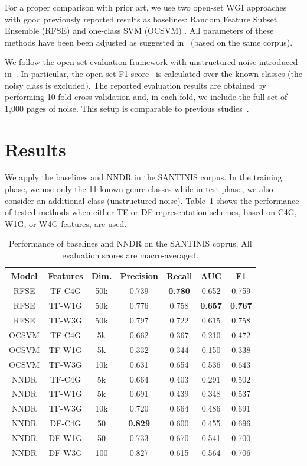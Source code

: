 \documentclass{llncs}
\begin{document}
For a proper comparison with prior art, we use two open-set WGI approaches with good previously reported results as baselines: Random Feature Subset Ensemble (RFSE) and one-class SVM (OCSVM) \cite{pritsos2013open,pritsos2018open}. All parameters of these methods have been been adjusted as suggested in~\cite{pritsos2018open} (based on the same corpus).

We follow the open-set evaluation framework with unstructured noise introduced in~\cite{pritsos2018open}. In particular, the open-set F1 score~\cite{mendesjunior2016} is calculated over the known classes (the noisy class is excluded). The reported evaluation results are obtained by performing 10-fold cross-validation and, in each fold, we include the full set of 1,000 pages of noise. This setup is comparable to previous studies~\cite{pritsos2018open}.

\section{Results}\label{sec:Experiments_Results}

We apply the baselines and NNDR in the SANTINIS corpus. In the training phase, we use only the 11 known genre classes while in test phase, we also consider an additional class (unstructured noise). Table~\ref{tbl:results} shows the performance of tested methods when either TF or DF representation schemes, based on C4G, W1G, or W4G features, are used. 

\begin{table}[t]
\center
\caption {Performance of baselines and NNDR on the SANTINIS coprus. All evaluation scores are macro-averaged.}
\label{tbl:results}
\begin{tabular}{ccccccc}
\hline
Model & Features & Dim. & Precision & Recall & AUC & F1 \\
\hline
RFSE & TF-C4G & 50k & 0.739 & \textbf{0.780} & 0.652 & 0.759 \\
RFSE & TF-W1G & 50k & 0.776 & 0.758 & \textbf{0.657} & \textbf{0.767} \\
RFSE & TF-W3G & 50k & 0.797 & 0.722 & 0.615 & 0.758 \\
OCSVM & TF-C4G & 5k & 0.662 & 0.367 & 0.210 & 0.472\\
OCSVM & TF-W1G & 5k & 0.332 & 0.344 & 0.150 & 0.338\\
OCSVM & TF-W3G & 10k & 0.631 & 0.654 & 0.536 & 0.643\\
NNDR & TF-C4G & 5k & 0.664 & 0.403 & 0.291 & 0.502 \\
NNDR & TF-W1G & 5k & 0.691 & 0.439 & 0.348 & 0.537 \\
NNDR & TF-W3G & 10k & 0.720 & 0.664 & 0.486 & 0.691 \\
NNDR & DF-C4G & 50 & \textbf{0.829} & 0.600 & 0.455 & 0.696 \\
NNDR & DF-W1G & 50 & 0.733 & 0.670 & 0.541 & 0.700 \\
NNDR & DF-W3G & 100 & 0.827 & 0.615 & 0.564 & 0.706 \\
\hline
\end{tabular}
\end{table}
\end{document}
